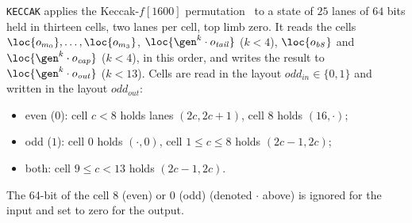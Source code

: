 \vspace{5mm}

\texttt{KECCAK} applies the Keccak-$f[1600]$ permutation~\cite{keccak} to a state of $25$ lanes of $64$ bits held in thirteen cells, two lanes per cell, top limb zero. It reads the cells $\loc{o_{m_0}},\dots,\loc{o_{m_3}}$, $\loc{\gen^k\cdot o_{\mathit{tail}}}$ ($k<4$), $\loc{o_{\mathit{b8}}}$ and $\loc{\gen^k\cdot o_{\mathit{cap}}}$ ($k<4$), in this order, and writes the result to $\loc{\gen^k\cdot o_{\mathit{out}}}$ ($k<13$). Cells are read in the layout $\mathit{odd}_{\mathit{in}}\in\{0,1\}$ and written in the layout $\mathit{odd}_{\mathit{out}}$:
\begin{itemize}
\item even ($0$): cell $c<8$ holds lanes $(2c,2c+1)$, cell $8$ holds $(16,\cdot)$;
\item odd ($1$): cell $0$ holds $(\cdot,0)$, cell $1\le c\le8$ holds $(2c-1,2c)$;
\item both: cell $9\le c<13$ holds $(2c-1,2c)$.
\end{itemize}
The 64-bit of the cell 8 (even) or 0 (odd) (denoted $\cdot$ above) is ignored for the input and set to zero for the output.


